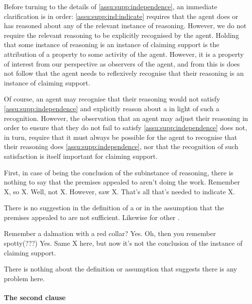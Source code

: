 \begin{note}
  Before turning to the details of \autoref{assu:supp:independence}, an immediate clarification is in order:
  \ref{assu:supp:ind:indicate} requires that the agent does or has reasoned about any  of the relevant instance of reasoning.
  However, we do not require the relevant reasoning to be explicitly recognised by the agent.
  Holding that some instance of reasoning is an instance of claiming support is the attribution of a property to some activity of the agent.
  However, it is a property of interest from our perspective as observers of the agent, and from this is does not follow that the agent needs to reflexively recognise that their reasoning is an instance of claiming support.

  Of course, an agent may recognise that their reasoning would not satisfy \autoref{assu:supp:independence} and explicitly reason about a  in light of such a recognition.
  However, the observation that an agent may adjust their reasoning in order to ensure that they do not fail to satisfy \autoref{assu:supp:independence} does not, in turn, require that it must always be possible for the agent to recognise that their reasoning does \autoref{assu:supp:independence}, nor that the recognition of such satisfaction is itself important for claiming support.
\end{note}

\begin{note}
  First, in case of \requ{} being the conclusion of the subinstance of reasoning, there is nothing to say that the premises appealed to aren't doing the work.
  Remember X, so X.
  Well, not X.
  However, saw X.
  That's all that's needed to indicate X.

  There is no suggestion in the definition of a \requ{} or in the assumption that the premises appealed to are not sufficient.
  Likewise for other \requ{}.

  Remember a dalmation with a red collar?
  Yes.
  Oh, then you remember spotty(???)
  Yes.
  Same X here, but now it's not the conclusion of the instance of claiming support.

  There is nothing about the definition or assumption that suggests there is any problem here.
\end{note}

\paragraph{The second clause}


